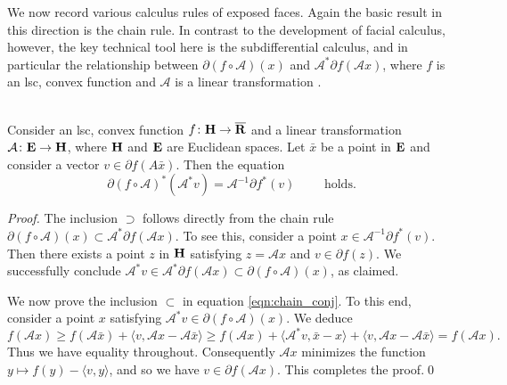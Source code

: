\documentclass[smallextended,numbook]{svjour3}
\begin{document}
We now record various calculus rules of exposed faces. Again the basic result in this direction is the chain rule. In contrast to the development of facial calculus, however, the key technical tool here is the subdifferential calculus, and in particular the relationship between $\partial (f\circ {\mathcal{A}})(x)$ and $\mathcal{A}^{*}\partial f({\mathcal{A}} x)$, where $f$ is an lsc, convex function and ${\mathcal{A}}$ is a linear transformation \cite[Theorem 23.9]{con_ter}. 
\begin{thm} \label{thm:chain_conj}{\hfill \\}
Consider an lsc, convex function $f\colon{\bf H}\to\overline{{\bf R}}$ and a linear transformation $\mathcal{A}\colon{{\bf E}}\to{\bf H}$, where ${\bf H}$ and ${{\bf E}}$ are Euclidean spaces. Let $\bar{x}$ be a point in ${{\bf E}}$ and consider a vector $v\in \partial f(A\bar{x})$. Then the equation
\begin{equation}\label{eqn:chain_conj}
\partial (f\circ {\mathcal{A}})^{*}({\mathcal{A}}^{*}v) = {\mathcal{A}}^{-1}\partial f^{*}(v) \qquad\textrm{ holds}.
\end{equation}
\end{thm}
\begin{proof}
The inclusion $\supset$ follows directly from the chain rule $\partial (f\circ {\mathcal{A}})(x)\subset \mathcal{A}^{*}\partial f({\mathcal{A}} x)$. To see this, consider a point $x\in {\mathcal{A}}^{-1}\partial f^{*}(v)$. Then there exists a point $z$ in ${\bf H}$ satisfying $z={\mathcal{A}} x$ and $v\in\partial f(z)$. We successfully conclude ${\mathcal{A}}^{*} v\in {\mathcal{A}}^{*}\partial f({\mathcal{A}} x)\subset \partial (f\circ {\mathcal{A}})(x)$, as claimed. 

We now prove the inclusion $\subset$ in equation \eqref{eqn:chain_conj}. To this end, consider a point $x$ satisfying ${\mathcal{A}}^{*}v\in \partial (f\circ{\mathcal{A}})(x)$. We deduce 
$$f({\mathcal{A}} x) \geq f({\mathcal{A}}\bar{x})+ \langle v, {\mathcal{A}} x-{\mathcal{A}} \bar{x}\rangle \geq f({\mathcal{A}} x) +\langle {\mathcal{A}}^{*}v, \bar{x}-x \rangle+ \langle v, {\mathcal{A}} x-{\mathcal{A}} \bar{x}\rangle =f({\mathcal{A}} x) .$$ Thus we have equality
 throughout. Consequently ${\mathcal{A}} x$ minimizes the function $y\mapsto f(y)-\langle v,y\rangle$, and so we have $v\in\partial f({\mathcal{A}} x)$. This completes the proof.\qed
\end{proof}
\end{document}
